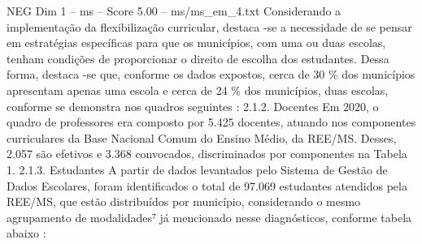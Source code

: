 \begin{textsample}{NEG Dim 1 – ms – Score 5.00 – ms/ms\_em\_4.txt}
Considerando a implementação da flexibilização curricular, destaca -se a necessidade de se pensar em estratégias específicas para que os municípios, com uma ou duas escolas, tenham condições de proporcionar o direito de escolha dos estudantes.
Dessa forma, destaca -se que, conforme os dados expostos, cerca de 30 \% dos municípios apresentam apenas uma escola e cerca de 24 \% dos municípios, duas escolas, conforme se demonstra nos quadros seguintes : 2.1.2.
Docentes Em 2020, o quadro de professores era composto por 5.425 docentes, atuando nos componentes curriculares da Base Nacional Comum do Ensino Médio, da REE/MS.
Desses, 2.057 são efetivos e 3.368 convocados, discriminados por componentes na Tabela 1. 2.1.3.
Estudantes A partir de dados levantados pelo Sistema de Gestão de Dados Escolares, foram identificados o total de 97.069 estudantes atendidos pela REE/MS, que estão distribuídos por município, considerando o mesmo agrupamento de modalidades⁷ já mencionado nesse diagnósticos, conforme tabela abaixo :

\end{textsample}
